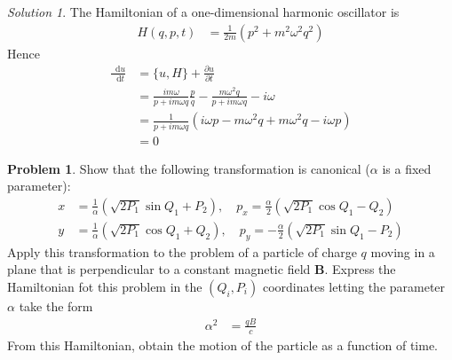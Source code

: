 \documentclass[twoside,11pt]{article}
\newcommand{\lms}{\fontfamily{lmss}\selectfont} %
\renewcommand*\d{\mathop{}\!\mathrm{d}}
\theoremstyle{definition}
\newtheorem{problem}{\lms Problem}
\theoremstyle{remark}
\newtheorem*{solution}{Solution}
\begin{document}
\begin{solution} 
The Hamiltonian of a one-dimensional harmonic oscillator is 
\begin{align*}
    H(q, p, t) &= \frac{1}{2m}(p^2 + m^2\omega^2 q^2)
\end{align*}
Hence
\begin{align*}
    \frac{\d u}{\d t}
    &= \{u, H\} + \frac{\partial u}{\partial t}\\
    &= \frac{im\omega}{p + im\omega q}\frac{p}{q} - 
    \frac{m\omega^2 q}{p + im\omega q} - i\omega\\
    &= \frac{1}{p + im\omega q}(i\omega p - m\omega^2 q + m\omega^2 q - i\omega p)\\
    &= 0
\end{align*}
\end{solution}




\begin{problem}
Show that the following transformation is canonical ($\alpha$ is a fixed parameter):
\begin{align}
    x &= \frac{1}{\alpha}(\sqrt{2P_1}\sin Q_1 + P_2), \quad 
    p_x = \frac{\alpha}{2}(\sqrt{2P_1}\cos Q_1 - Q_2) \nonumber \\
    y &= \frac{1}{\alpha}(\sqrt{2P_1}\cos Q_1 + Q_2), \quad 
    p_y = -\frac{\alpha}{2}(\sqrt{2P_1}\sin Q_1 - P_2)
\end{align}
Apply this transformation to the problem of a particle of charge $q$ moving
in a plane that is perpendicular to a constant magnetic field $\mathbf{B}$.
Express the Hamiltonian fot this problem in the $(Q_i,P_i)$ coordinates
letting the parameter $\alpha$ take the form
\begin{align}
    \alpha^2 &= \frac{qB}{c}
\end{align}
From this Hamiltonian, obtain the motion of the particle as a function of time.
\end{problem}
\end{document}
